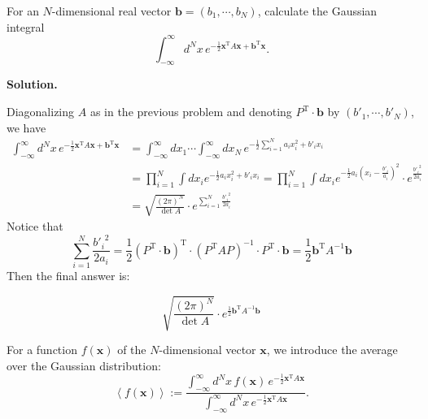 \documentclass[11pt,a4paper]{article}
\newcounter{problem}
\newcounter{saveequation}
\newenvironment{solution}
{
	\par
	\setcounter{saveequation}{\value{equation}}
	\begingroup
	\setcounter{equation}{0}
	\renewcommand{\theequation}{\arabic{problem}.\arabic{equation}}
	\renewcommand{\theHequation}{sol.\arabic{problem}.\arabic{equation}}
	\noindent\textbf{Solution.}\quad
}
{
	\par
	\endgroup
	\setcounter{equation}{\value{saveequation}}
}
\begin{document}
	\begin{problembox}
		For an $N$-dimensional real vector $\boldsymbol{b}=(b_1,\cdots,b_N)$, calculate the Gaussian integral
		\begin{equation}
			\int_{-\infty}^{\infty} d^N x\, e^{-\frac{1}{2}\boldsymbol{x}^{\mathrm{T}}A\boldsymbol{x}+\boldsymbol{b}^{\mathrm{T}}\boldsymbol{x}}.
		\end{equation}
	\end{problembox}
	\begin{solution}
		Diagonalizing $A$ as in the previous problem and denoting $P^\mathrm{T}\cdot\boldsymbol{b}$ by $(b'_1,\cdots,b'_N)$, we have
		\begin{equation}
			\begin{aligned}
				\int_{-\infty}^{\infty} d^N x\, e^{-\frac{1}{2}\boldsymbol{x}^{\mathrm{T}}A\boldsymbol{x}+\boldsymbol{b}^{\mathrm{T}}\boldsymbol{x}}&=\int_{-\infty}^{\infty} dx_1\cdots\int_{-\infty}^{\infty} dx_N\,
				e^{-\frac{1}{2}\sum_{i=1}^{N}a_i x_i^2+b'_i x_i}\\
				&=\prod_{i=1}^{N}\int dx_i e^{-\frac12 a_i x_i^2+b'_i x_i}=\prod_{i=1}^{N}\int dx_i e^{-\frac12 a_i (x_i-\frac{b'_i}{a_i})^2}\cdot e^{\frac{{b'_i}^2}{2a_i}}\\
				&=\sqrt{\frac{(2\pi)^{N}}{\det A}}\cdot e^{\sum_{i=1}^N\frac{{b'_i}^2}{2a_i}}
			\end{aligned}
		\end{equation}
		Notice that
		\begin{equation}
			\sum_{i=1}^N\frac{{b'_i}^2}{2a_i}=\frac12 (P^\mathrm{T}\cdot\boldsymbol{b})^\mathrm{T}\cdot (P^\mathrm{T} A P)^{-1}\cdot P^\mathrm{T}\cdot\boldsymbol{b}=\frac12 \boldsymbol{b}^\mathrm{T} A^{-1} \boldsymbol{b}
		\end{equation}
		Then the final answer is:
		\begin{finalanswer}
			\begin{equation}
				\label{fin:2}
				\sqrt{\frac{(2\pi)^{N}}{\det A}}\cdot e^{\frac12 \boldsymbol{b}^\mathrm{T} A^{-1} \boldsymbol{b}}
			\end{equation}
		\end{finalanswer}
	\end{solution}
	
	For a function $f(\boldsymbol{x})$ of the $N$-dimensional vector $\boldsymbol{x}$, we introduce the average over the Gaussian distribution:
	\begin{equation}
		\left\langle f(\boldsymbol{x}) \right\rangle :=
		\frac{\displaystyle \int_{-\infty}^{\infty} d^N x\, f(\boldsymbol{x})\, e^{-\frac{1}{2}\boldsymbol{x}^{\mathrm{T}}A\boldsymbol{x}}}
		{\displaystyle \int_{-\infty}^{\infty} d^N x\, e^{-\frac{1}{2}\boldsymbol{x}^{\mathrm{T}}A\boldsymbol{x}}}.
	\end{equation}
	
\end{document}
